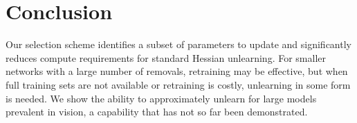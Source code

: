 \section{Conclusion}
Our selection scheme identifies a subset of parameters to update and significantly reduces compute requirements for standard Hessian unlearning. 
For smaller networks with a large number of removals, retraining may be effective, but when full training sets are not available or retraining is costly, unlearning in some form is needed. 
We show the ability to approximately unlearn for large models prevalent in vision, a capability that has not so far been demonstrated.  


